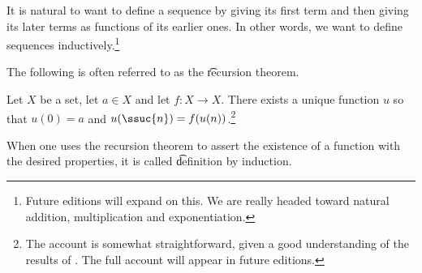 

It is natural to want to define a sequence by giving its first term and then giving its later terms as functions of its earlier ones.
In other words, we want to define sequences inductively.\footnote{Future editions will expand on this. We are really headed toward natural addition, multiplication and exponentiation.}


The following is often referred to as the \t{recursion theorem}.

\begin{proposition}
Let $X$ be a set, let $a \in X$ and let $f: X \to X$.
  There exists a unique function $u$ so that $u(0) = a$ and $u(\ssuc{n}) = f(u(n))$.\footnote{The account is somewhat straightforward, given a good understanding of the results of . The full account will appear in future editions.}
\end{proposition}

When one uses the recursion theorem to assert the existence of a function with the desired properties, it is called \t{definition by induction}.

\blankpage
